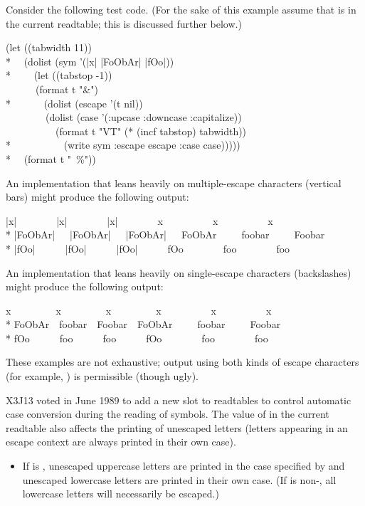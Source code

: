 \begin{defun}[Variable]
\begin{newer}
Consider the following test code.  (For the sake of this example
assume that  is  in the current readtable; this is
discussed further below.)
\begin{lisp}
(let ((tabwidth 11)) \\*
~~(dolist (sym '(|x| |FoObAr| |fOo|)) \\*
~~~~(let ((tabstop -1)) \\
~~~~~~(format t "{\Xtilde}\&") \\*
~~~~~~(dolist (escape '(t nil)) \\
~~~~~~~~(dolist (case '(:upcase :downcase :capitalize)) \\
~~~~~~~~~~(format t "{\Xtilde}VT" (* (incf tabstop) tabwidth)) \\*
~~~~~~~~~~(write sym :escape escape :case case))))) \\*
~~(format t "~\%"))
\end{lisp}
An implementation that leans heavily on multiple-escape characters (vertical bars)
might produce the following output:
\begin{lisp}
|x|~~~~~~~~|x|~~~~~~~~|x|~~~~~~~~x~~~~~~~~~~x~~~~~~~~~~x \\*
|FoObAr|~~~|FoObAr|~~~|FoObAr|~~~FoObAr~~~~~foobar~~~~~Foobar \\*
|fOo|~~~~~~|fOo|~~~~~~|fOo|~~~~~~fOo~~~~~~~~foo~~~~~~~~foo
\end{lisp}
An implementation that leans heavily on single-escape characters (backslashes)
might produce the following output:
\begin{lisp}
{\Xbackslash}x~~~~~~~~~{\Xbackslash}x~~~~~~~~~{\Xbackslash}x~~~~~~~~~x~~~~~~~~~~x~~~~~~~~~~x \\*
F{\Xbackslash}oO{\Xbackslash}bA{\Xbackslash}r~~f{\Xbackslash}oo{\Xbackslash}ba{\Xbackslash}r~~F{\Xbackslash}oo{\Xbackslash}ba{\Xbackslash}r~~FoObAr~~~~~foobar~~~~~Foobar \\*
{\Xbackslash}fO{\Xbackslash}o~~~~~~{\Xbackslash}fo{\Xbackslash}o~~~~~~{\Xbackslash}fo{\Xbackslash}o~~~~~~fOo~~~~~~~~foo~~~~~~~~foo
\end{lisp}
These examples are not exhaustive; output using both kinds of escape characters
(for example, ) is permissible (though ugly).

X3J13 voted in June 1989 
to add a new  slot to readtables to control
automatic case conversion during the reading of symbols.
The value of  in the current readtable also affects the printing
of unescaped letters (letters appearing in an escape context are always
printed in their own case).
\begin{itemize}
\item If  is , unescaped uppercase letters are printed
    in the case specified by  and unescaped lowercase letters
    are printed in their own case.  (If  is non-{\false},
    all lowercase letters will necessarily be escaped.)


\end{itemize}
\end{newer}
\end{defun}
